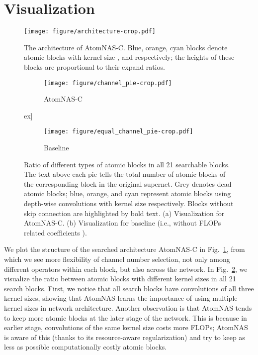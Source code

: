 \documentclass{article} \usepackage{iclr2020_conference,times}
\newcommand{\flops}{FLOPs\xspace}
\begin{document}



\appendix
\section{Visualization}\label{sec:vis}

\begin{figure}[htbp]
    \centering
    \texttt{[image: figure/architecture-crop.pdf]}
    \caption{The architecture of AtomNAS-C. Blue, orange, cyan blocks denote atomic blocks with kernel size ,  and  respectively; the heights of these blocks are proportional to their expand ratios.}
    \label{fig:atomnas_m_arch}
\end{figure}

\begin{figure}[btp]
    \begin{subfigure}[b]{\textwidth}
        \centering
        \texttt{[image: figure/channel\_pie-crop.pdf]}
        \caption{AtomNAS-C}
        \label{fig:mmodel_pie}
    \end{subfigure}
\3ex]
    \begin{subfigure}[b]{\textwidth}
        \centering
        \texttt{[image: figure/equal\_channel\_pie-crop.pdf]}
        \caption{Baseline}
        \label{fig:channel_pie_equal}
    \end{subfigure}
    \caption{Ratio of different types of atomic blocks in all 21 searchable blocks.
    The text above each pie tells the total number of atomic blocks of the corresponding block in the original supernet. Grey denotes dead atomic blocks; blue, orange, and cyan represent atomic blocks using depth-wise convolutions with kernel size  respectively. Blocks without skip connection are highlighted by bold text.
    (a) Visualization for AtomNAS-C. (b) Visualization for baseline (i.e., without \flops related coefficients ).
    }
\end{figure}



We plot the structure of the searched architecture AtomNAS-C in Fig.~\ref{fig:atomnas_m_arch}, from which we see more flexibility of channel number selection, not only among different operators within each block, but also across the network. In Fig.~\ref{fig:mmodel_pie}, we visualize the ratio between atomic blocks with different kernel sizes in all 21 search blocks. First, we notice that all search blocks have convolutions of all three kernel sizes, showing that AtomNAS learns the importance of using multiple kernel sizes in network architecture. Another observation is that AtomNAS tends to keep more atomic blocks at the later stage of the network. This is because in earlier stage, convolutions of the same kernel size costs more \flops; AtomNAS is aware of this (thanks to its resource-aware regularization) and try to keep as less as possible computationally costly atomic blocks.
\end{document}
